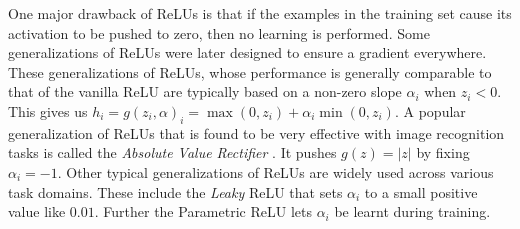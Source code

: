 \documentclass[12pt]{extarticle}
\numberwithin{equation}{section}
\begin{document}
	One major drawback of ReLUs is that if the examples in the training set cause its activation to be pushed to zero, then no learning is performed. Some generalizations of ReLUs were later designed to ensure a gradient everywhere. These generalizations of ReLUs, whose performance is generally comparable to that of the vanilla ReLU are typically based on a non-zero slope $\alpha_i$ when $z_i < 0$. This gives us  $h_i = g(z_i,\alpha)_i = \max(0,z_i) + \alpha_i \min(0,z_i)$. A popular generalization of ReLUs that is found to be very effective with image recognition tasks is called the \textit{Absolute Value Rectifier} \cite{jarrett2009best}. It pushes $g(z) = |z| $ by fixing $\alpha_i = -1$. Other typical generalizations of ReLUs are widely used across various task domains. These include the \textit{Leaky} ReLU that sets $\alpha_i$ to a small positive value like $0.01$\cite{maas2013rectifier}. Further the Parametric ReLU lets $\alpha_i$ be learnt during training\cite{he2015delving}.
\end{document}
